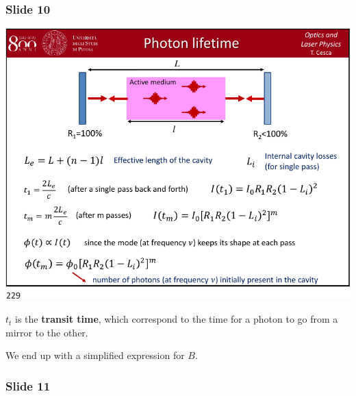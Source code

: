 \documentclass[../main/main.tex]{subfiles}
\begin{document}
\subsubsection*{Slide 10}

\begin{minipage}[]{0.5\linewidth}
\centering
\includegraphics[page=10,width=1\textwidth]{../lessons/pdf_file/12_lecture.pdf}
\end{minipage}
\hspace{0.3cm}\vspace{0.3cm}
\begin{minipage}[c]{0.47\linewidth}

\( t_t \) is the \textbf{transit time}, which correspond to the time for a photon to go from a mirror to the other.

We end up with a simplified expression for \( B \).

\end{minipage}

\subsubsection*{Slide 11}
\end{document}
